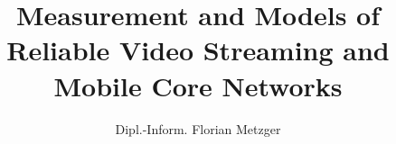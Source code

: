 
\title{Measurement and Models of Reliable Video Streaming and Mobile Core Networks}
\author{Dipl.-Inform. Florian Metzger}
\newcommand{\betreuer}{Univ.-Prof.~Dipl.-Ing.~Dr.~Helmut Hlavacs}
\newcommand{\gutachterA}{Univ.-Prof.~Dipl.-Math.~Dr.~Peter Reichl,~M.A.~St.}
\newcommand{\gutachterB}{~}

\newcommand{\dissertationsgebiet}{Informatik}
\newcommand{\studienkennzahl}{A 786 880}
\newcommand{\akademischergrad}{Doktor der technischen Wissenschaften (Dr. tech.)}